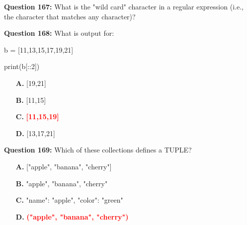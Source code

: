 \documentclass[12pt,a4paper]{article}
\begin{document}
\vspace{0.5cm}

\textbf{Question 167:} What is the "wild card" character in a regular expression (i.e., the character that matches any character)?


\vspace{0.5cm}

\textbf{Question 168:} What is output for:\newline

\newline
\newline

\newline
b = [11,13,15,17,19,21]\newline

\newline
print(b[::2])

\begin{itemize}
    \item[\textbf{A.}] [19,21]
    \item[\textbf{B.}] [11,15]
    \item[\textbf{C.}] \textcolor{red}{\textbf{[11,15,19]}}
    \item[\textbf{D.}] [13,17,21]
\end{itemize}

\vspace{0.5cm}

\textbf{Question 169:} Which of these collections defines a TUPLE?

\begin{itemize}
    \item[\textbf{A.}] ["apple", "banana", "cherry"]
    \item[\textbf{B.}] "apple", "banana", "cherry"
    \item[\textbf{C.}] "name": "apple", "color": "green"
    \item[\textbf{D.}] \textcolor{red}{\textbf{("apple", "banana", "cherry")}}
\end{itemize}

\vspace{0.5cm}
\end{document}
